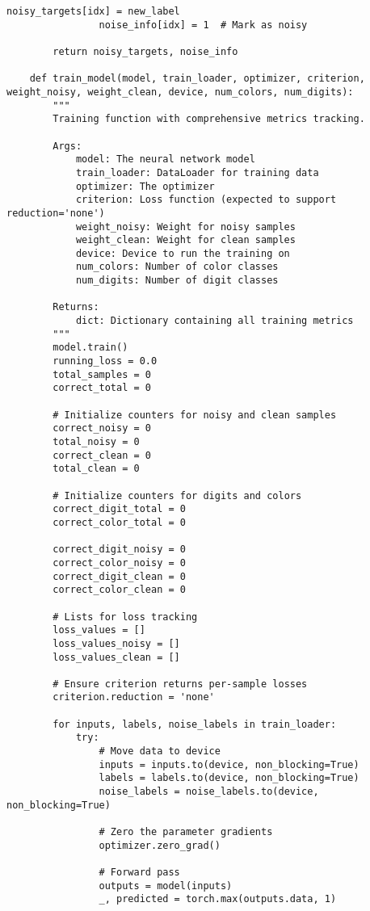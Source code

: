 \begin{lstlisting}[style=pythonstyle, caption={Program Example}]
                noisy_targets[idx] = new_label
                noise_info[idx] = 1  # Mark as noisy
    
        return noisy_targets, noise_info
    
    def train_model(model, train_loader, optimizer, criterion, weight_noisy, weight_clean, device, num_colors, num_digits):
        """
        Training function with comprehensive metrics tracking.
        
        Args:
            model: The neural network model
            train_loader: DataLoader for training data
            optimizer: The optimizer
            criterion: Loss function (expected to support reduction='none')
            weight_noisy: Weight for noisy samples
            weight_clean: Weight for clean samples
            device: Device to run the training on
            num_colors: Number of color classes
            num_digits: Number of digit classes
            
        Returns:
            dict: Dictionary containing all training metrics
        """
        model.train()
        running_loss = 0.0
        total_samples = 0
        correct_total = 0
    
        # Initialize counters for noisy and clean samples
        correct_noisy = 0
        total_noisy = 0
        correct_clean = 0
        total_clean = 0
    
        # Initialize counters for digits and colors
        correct_digit_total = 0
        correct_color_total = 0
    
        correct_digit_noisy = 0
        correct_color_noisy = 0
        correct_digit_clean = 0
        correct_color_clean = 0
    
        # Lists for loss tracking
        loss_values = []
        loss_values_noisy = []
        loss_values_clean = []
    
        # Ensure criterion returns per-sample losses
        criterion.reduction = 'none'
    
        for inputs, labels, noise_labels in train_loader:
            try:
                # Move data to device
                inputs = inputs.to(device, non_blocking=True)
                labels = labels.to(device, non_blocking=True)
                noise_labels = noise_labels.to(device, non_blocking=True)
    
                # Zero the parameter gradients
                optimizer.zero_grad()
    
                # Forward pass
                outputs = model(inputs)
                _, predicted = torch.max(outputs.data, 1)
                

\end{lstlisting}
